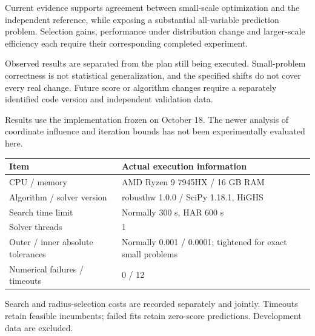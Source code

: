 \documentclass[11pt,a4paper]{article}
\newcommand{\topic}[1]{\par\vspace{8pt}{\large\bfseries\color{ink}#1}\par\vspace{2pt}}
\newcommand{\noteline}[1]{\par{\small #1}\par}
\begin{document}
Current evidence supports agreement between small-scale optimization and the independent reference, while exposing a substantial all-variable prediction problem. Selection gains, performance under distribution change and larger-scale efficiency each require their corresponding completed experiment.

Observed results are separated from the plan still being executed. Small-problem correctness is not statistical generalization, and the specified shifts do not cover every real change. Future score or algorithm changes require a separately identified code version and independent validation data.

Results use the implementation frozen on October 18. The newer analysis of coordinate influence and iteration bounds has not been experimentally evaluated here.

\topic{Actual execution conditions}
{\small
\begin{tabularx}{\linewidth}{@{}P{38mm}Y@{}}\toprule
Item & Actual execution information\\\midrule
CPU / memory & AMD Ryzen 9 7945HX / 16 GB RAM\\
Algorithm / solver version & robusthw 1.0.0 / SciPy 1.18.1, HiGHS\\
Search time limit & Normally 300 s, HAR 600 s\\
Solver threads & 1\\
Outer / inner absolute tolerances & Normally 0.001 / 0.0001; tightened for exact small problems\\
Numerical failures / timeouts & 0 / 12\\
\bottomrule\end{tabularx}}
\noteline{}

Search and radius-selection costs are recorded separately and jointly. Timeouts retain feasible incumbents; failed fits retain zero-score predictions. Development data are excluded.
\end{document}
